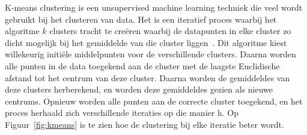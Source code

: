 K-means clustering is een unsupervised machine learning techniek die veel wordt
gebruikt bij het clusteren van data. Het is een iteratief proces waarbij het
algoritme $k$ clusters tracht te creëren waarbij de datapunten in elke cluster
zo dicht mogelijk bij het gemiddelde van die cluster
liggen~\cite{Understa24:online}. Dit algoritme kiest willekeurig initiële
middelpunten voor de verschillende clusters. Daarna worden alle punten in de
data toegekend aan de cluster met de laagste Euclidische afstand tot het
centrum van deze cluster. Daarna worden de gemiddeldes van deze clusters
herberekend, en worden deze gemiddeldes gezien als nieuwe centrums. Opnieuw
worden alle punten aan de correcte cluster toegekend, en het proces herhaald
zich verschillende iteraties op die manier h. Op Figuur~\ref{fig:kmeans} is te
zien hoe de clustering bij elke iteratie beter wordt.
